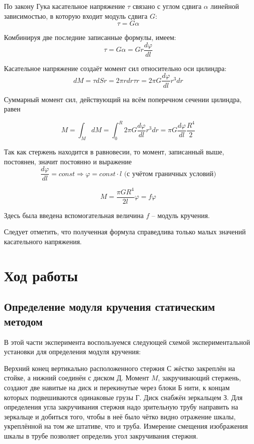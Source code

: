 \documentclass[a4paper, 12pt]{article} %
\begin{document}
По закону Гука касательное напряжение $\tau$ связано с углом сдвига $\alpha$ линейной зависимостью, в которую входит модуль сдвига $G$:
\[\tau = G \alpha\]

Комбинируя две последние записанные формулы, имеем:
\[\tau = G \alpha = G r \frac{d\varphi}{d l}\]

Касательное напряжение создаёт момент сил относительно оси цилиндра:
\[dM = \tau dS  r = 2 \pi r dr \tau r = 2 \pi G \frac{d\varphi}{d l} r^3 dr\]

Суммарный момент сил, действующий на всём поперечном сечении цилиндра, равен

\[M = \int_M dM = \int_0^{R}2 \pi G \frac{d\varphi}{d l} r^3 dr = \pi G \frac{d\varphi}{d l} \frac{R^4}{2}\]

Так как стержень находится в равновесии, то момент, записанный выше, постоянен, значит постоянно и выражение
\[\frac{d\varphi}{d l} = const \Rightarrow \varphi = const \cdot l \text{ (с учётом граничных условий)}\]

\[M = \frac{\pi G R^4}{2l} \varphi = f \varphi\]

Здесь была введена вспомогательная величина $f$ -- модуль кручения. 

Следует отметить, что полученная формула справедлива только малых значений касательного напряжения.\\


\section{Ход работы}
\subsection{Определение модуля кручения статическим методом}

В этой части эксперимента воспользуемся следующей схемой экспериментальной установки для определения модуля кручения:

Верхний конец вертикально расположенного стержня С жёстко закреплён на стойке, а нижний соединён с диском Д. Момент $M$, закручивающий стержень, создают две навитые на диск и перекинутые через блоки Б нити, к концам которых подвешиваются одинаковые грузы Г. Диск снабжён зеркальцем З. Для определения угла закручивания стержня надо зрительную трубу направить на зеркальце и добиться того, чтобы в неё было чётко видно отражение шкалы, укреплённой на том же штативе, что и труба. Измерение смещения изображения шкалы в трубе позволяет определиь угол закручивания стержня.
\end{document}
